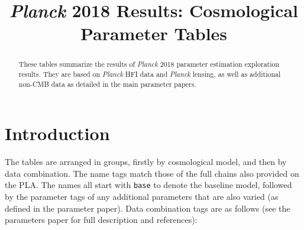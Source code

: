 \title{\textit{Planck} 2018 Results: Cosmological Parameter Tables}


\maketitle
\begin{abstract}
These tables summarize the results of \textit{Planck} 2018 parameter estimation exploration results.
They are based on \textit{Planck} HFI data and \textit{Planck} lensing, as well as additional non-CMB data as detailed in the main parameter papers.
\end{abstract}

\section{Introduction}
The tables are arranged in groups, firstly by cosmological model, and then by data combination. The name tags match those of the full chains also provided on the PLA. The names all start with {\tt base} to denote the baseline model, followed by the parameter tags of any additional parameters that are also varied (as defined in the parameter paper). Data combination tags are as follows (see the parameters paper for full description and references):

